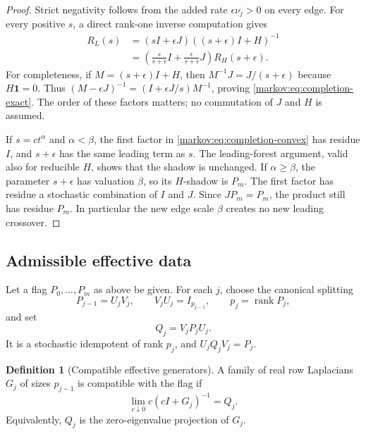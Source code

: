 \documentclass[11pt]{article}
\numberwithin{equation}{section}
\theoremstyle{definition}
\newtheorem{definition}[theorem]{Definition}
\theoremstyle{remark}
\newcommand{\one}{\mathbf 1}
\newcommand{\rank}{\operatorname{rank}}
\begin{document}
\begin{proof}
Strict negativity follows from the added rate $\epsilon\nu_j>0$ on every edge.
For every positive $s$, a direct rank-one inverse computation gives
\begin{align}
 R_L(s)
  &=(sI+\epsilon J)((s+\epsilon)I+H)^{-1}\label{markov:eq:completion-exact}\\
  &=\left(\frac{s}{s+\epsilon}I+
           \frac{\epsilon}{s+\epsilon}J\right)R_H(s+\epsilon).
           \label{markov:eq:completion-convex}
\end{align}
For completeness, if $M=(s+\epsilon)I+H$, then $M^{-1}J=J/(s+\epsilon)$ because
$H\one=0$. Thus
$(M-\epsilon J)^{-1}=(I+\epsilon J/s)M^{-1}$, proving
\eqref{markov:eq:completion-exact}. The order of these factors matters; no commutation
of $J$ and $H$ is assumed.

If $s=ct^\alpha$ and $\alpha<\beta$, the first factor in
\eqref{markov:eq:completion-convex} has residue $I$, and $s+\epsilon$ has the same
leading term as $s$. The leading-forest argument, valid also for reducible
$H$, shows that the shadow is unchanged. If $\alpha\ge\beta$, the parameter
$s+\epsilon$ has valuation $\beta$, so its $H$-shadow is $P_m$.
The first factor has residue a stochastic combination of $I$ and $J$.
Since $JP_m=P_m$, the product still has residue $P_m$. In particular the new
edge scale $\beta$ creates no new leading crossover.
\end{proof}

\subsection{Admissible effective data}

Let a flag $P_0,\ldots,P_m$ as above be given. For each $j$, choose the canonical
splitting
\[
 P_{j-1}=U_jV_j,\qquad V_jU_j=I_{p_{j-1}},\qquad
 p_j=\rank P_j,
\]
and set
\begin{equation}\label{markov:eq:macro-next}
 Q_j=V_jP_jU_j.
\end{equation}
It is a stochastic idempotent of rank $p_j$, and $U_jQ_jV_j=P_j$.

\begin{definition}[Compatible effective generators]\label{markov:def:compatible}
A family of real row Laplacians $G_j$ of sizes $p_{j-1}$ is compatible with the
flag if
\begin{equation}\label{markov:eq:compatible}
 \lim_{c\downarrow0}c(cI+G_j)^{-1}=Q_j.
\end{equation}
Equivalently, $Q_j$ is the zero-eigenvalue projection of $G_j$.
\end{definition}
\end{document}
